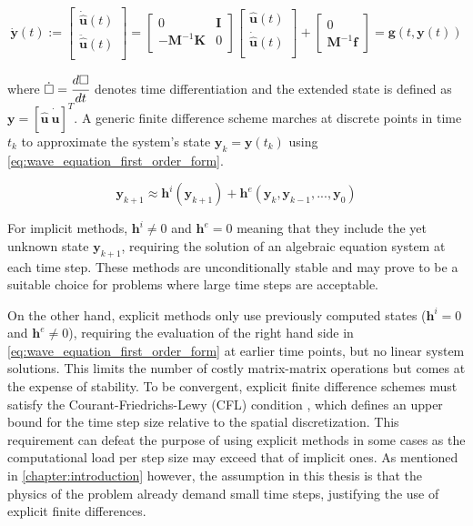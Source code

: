 \begin{equation} \label{eq:wave_equation_first_order_form}
	\dot{\mathbf y}(t) := 
	\begin{bmatrix}
		\dot{\hat{\mathbf u}}(t) \\
		\ddot{\hat{\mathbf u}}(t) \\
	\end{bmatrix}
	=
	\begin{bmatrix}
		0 & \mathbf I \\
		- \mathbf M^{-1} \mathbf K & 0 \\
	\end{bmatrix}
	\begin{bmatrix}
		\hat{\mathbf u}(t) \\
		\dot{\hat{\mathbf u}}(t) \\
	\end{bmatrix}
	+
	\begin{bmatrix}
		0 \\
		\mathbf M^{-1} \mathbf f
	\end{bmatrix}
	=
	\mathbf g(t, \mathbf y(t))
\end{equation}

where $\dot \square = \cfrac{d \square}{d t}$ denotes time differentiation and the extended state is defined as $\mathbf y = [\hat{\mathbf u} \ \dot{\hat{\mathbf u}}]^T$. A generic finite difference scheme marches at discrete points in time $t_k$ to approximate the system's state $\mathbf y_k = \mathbf y(t_k)$ using \ref{eq:wave_equation_first_order_form}.

\begin{equation} \label{eq:generic_finite_differences}
	\mathbf y_{k+1} \approx \mathbf h^i(\mathbf y_{k+1}) + \mathbf h^e(\mathbf y_k, \mathbf y_{k-1}, ..., \mathbf y_0)
\end{equation}

For implicit methods, $\mathbf h^i \neq 0$ and $\mathbf h^e = 0$ meaning that they include the yet unknown state $\mathbf y_{k+1}$, requiring the solution of an algebraic equation system at each time step. These methods are unconditionally stable and may prove to be a suitable choice for problems where large time steps are acceptable.

On the other hand, explicit methods only use previously computed states ($\mathbf h^i = 0$ and $\mathbf h^e \neq 0$), requiring the evaluation of the right hand side in \ref{eq:wave_equation_first_order_form} at earlier time points, but no linear system solutions. This limits the number of costly matrix-matrix operations but comes at the expense of stability. To be convergent, explicit finite difference schemes must satisfy the Courant-Friedrichs-Lewy (CFL) condition \cite{Courant1967}, which defines an upper bound for the time step size relative to the spatial discretization. This requirement can defeat the purpose of using explicit methods in some cases as the computational load per step size may exceed that of implicit ones. As mentioned in \ref{chapter:introduction} however, the assumption in this thesis is that the physics of the problem already demand small time steps, justifying the use of explicit finite differences.

